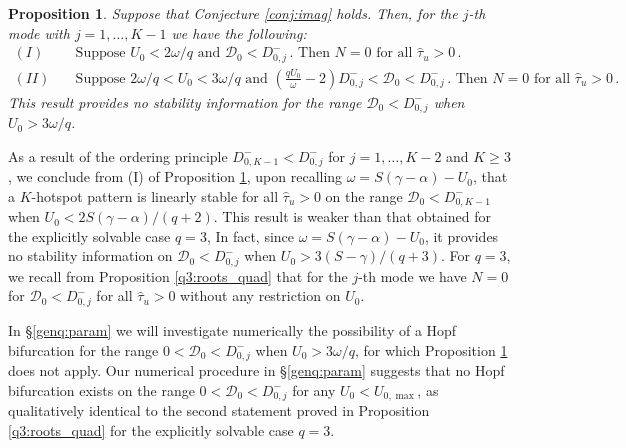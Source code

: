\documentclass{article}%
\newtheorem{prop}[theorem]{Proposition}
\newcommand{\bsub}{\begin{subequations}}
\newcommand{\esub}{\end{subequations}$\!$}
\newcommand{\dzjm}{D^{-}_{0,j}}
\begin{document}
\begin{prop}\label{prop:genq:gap} Suppose that Conjecture \ref{conj:imag} 
holds. Then, for the $j$-th mode with $j=1,\ldots,K-1$ we have the following:
\bsub\label{genq:gap}
\begin{align}
  (I) \quad  &\mbox{Suppose } U_0<{2\omega/q} \mbox{ and } 
    {\mathcal D}_0<\dzjm\,. \mbox{ Then } N=0 \,\, \mbox{for all }
     \hat{\tau}_u >0 \,.\label{genq:gap_1} \\
  (II) \quad  &\mbox{Suppose } {2\omega/q} < U_0<{3\omega/q} \mbox{ and } 
    \left(\frac{q U_0}{\omega}-2\right) \dzjm<{\mathcal D}_0<\dzjm\,. 
   \mbox{ Then } N=0 \,\, \mbox{for all } \hat{\tau}_u>0 \,.\label{genq:gap_2}
\end{align}
\esub This result provides no stability information for the range
${\mathcal D}_0<\dzjm$ when $U_0>{3\omega/q}$. 
\end{prop}

As a result of the ordering principle $D^{-}_{0,K-1}<D^{-}_{0,j}$ for
$j=1,\ldots,K-2$ and $K\geq 3$, we conclude from (I) of Proposition
\ref{prop:genq:gap}, upon recalling $\omega=S(\gamma-\alpha)-U_0$,
that a $K$-hotspot pattern is linearly stable for all $\hat{\tau}_u>0$
on the range ${\mathcal D}_0<D^{-}_{0,K-1}$ when
$U_0<{2S(\gamma-\alpha)/(q+2)}$. This result is weaker than that
obtained for the explicitly solvable case $q=3$, In fact, since
$\omega=S(\gamma-\alpha)-U_0$, it provides no stability information on
${\mathcal D}_0<D^{-}_{0,j}$ when $U_0>3{(S-\gamma)/(q+3)}$. For
$q=3$, we recall from Proposition \ref{q3:roots_quad} that for the
$j$-th mode we have $N=0$ for ${\mathcal D}_0<\dzjm$ for all
$\hat{\tau}_u>0$ without any restriction on $U_0$.

In \S \ref{genq:param} we will investigate numerically the possibility
of a Hopf bifurcation for the range $0<{\mathcal D}_0<D^{-}_{0,j}$
when $U_0>{3\omega/q}$, for which Proposition \ref{prop:genq:gap} does not
apply. Our numerical procedure in \S \ref{genq:param} suggests that
no Hopf bifurcation exists on the range $0<{\mathcal
  D}_0<D^{-}_{0,j}$ for any $U_0<U_{0,\max}$, as qualitatively identical to
the second statement proved in Proposition \ref{q3:roots_quad} for the
explicitly solvable case $q=3$.
\end{document}
